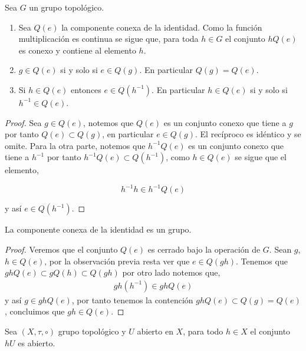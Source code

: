 \begin{ob}
	Sea $G$ un grupo topológico.
	
	\begin{enumerate}
	\item Sea $Q(e)$ la componente conexa de la identidad. Como la función multiplicación es continua se sigue que, para toda $h \in G$ el conjunto $hQ(e)$ es conexo y contiene al elemento $h$.

 \item $g \in Q(e)$ si y solo si $e \in Q(g).$ En particular $Q(g)=Q(e)$.
 
 \item  Si $h \in Q(e)$ entonces $e \in Q(h^{-1})$. En particular $h \in Q(e)$ si y solo si $h^{-1}\in Q(e)$.
	\end{enumerate}
 \end{ob}	
 
 \begin{proof}
 Sea $g \in Q(e)$, notemos que $Q(e)$ es un conjunto conexo que tiene a $g$ por tanto $Q(e) \subset Q(g)$, en particular $e \in Q(g).$ El recíproco es idéntico y se omite. Para la otra parte, notemos que $h^{-1}Q(e)$ es un conjunto conexo que tiene a $h^{-1}$ por tanto $h^{-1}Q(e) \subset Q(h^{-1})$, como $h \in Q(e)$ se sigue que el elemento,

$$h^{-1}h \in h^{-1}Q(e)$$

y así $e \in Q(h^{-1})$.  
\end{proof}

\begin{lm}\label{lm:Q(e) es grupo}
La componente conexa de la identidad es un grupo.
\end{lm}


\begin{proof}
 Veremos que el conjunto $Q(e)$ es cerrado bajo la operación de $G$. Sean $g$, $h \in Q(e)$, por la observación previa resta ver que $e \in Q(gh)$. Tenemos que $ ghQ(e) \subset gQ(h) \subset Q(gh)$ por otro lado notemos que, 
 \begin{align*}
 gh(h^{-1}) \in  ghQ(e)
 \end{align*}
 y así $g \in ghQ(e)$, por tanto tenemos la contención $ghQ(e) \subset Q(g)=Q(e)$, concluimos que $gh \in Q(e).$
 \end{proof}	
	
	
	
\begin{lm}\label{lm:gU_es_abierto}
Sea $(X,\tau, \circ)$ grupo topológico y $U$ abierto en $X$, para todo $h \in X$ el conjunto $hU$ es abierto.
\end{lm}

